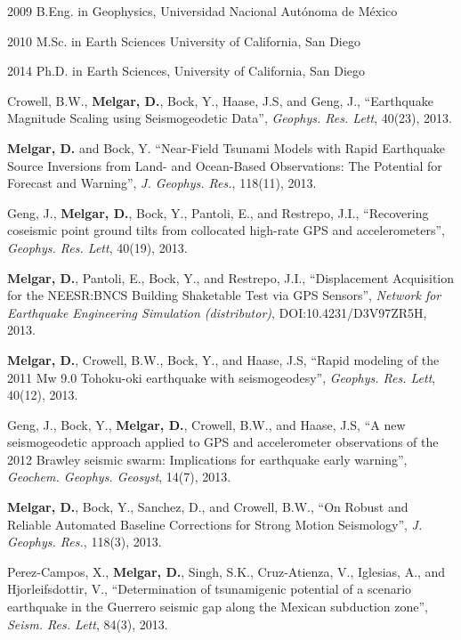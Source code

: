 \begin{frontmatter}
%
%
\begin{vitapage}
\begin{vita}
  \item[2009] B.Eng. in Geophysics, Universidad Nacional Aut\'onoma de M\'exico
  \item[2010] M.Sc. in Earth Sciences University of California, San Diego
  \item[2014] Ph.D. in Earth Sciences, University of California, San Diego 
\end{vita}
\begin{publications}
\item Crowell, B.W., \textbf{Melgar, D.}, Bock, Y., Haase, J.S, and Geng, J., ``Earthquake Magnitude Scaling using Seismogeodetic Data'', \emph{Geophys. Res. Lett}, 40(23), 2013.
\item \textbf{Melgar, D.} and Bock, Y. ``Near-Field Tsunami Models with Rapid Earthquake Source Inversions from Land- and Ocean-Based Observations: The Potential for Forecast and Warning'', \emph{J. Geophys. Res.}, 118(11), 2013.
\item Geng, J., \textbf{Melgar, D.}, Bock, Y., Pantoli, E., and Restrepo, J.I., ``Recovering coseismic point ground tilts from collocated high-rate GPS and accelerometers'', \emph{Geophys. Res. Lett}, 40(19), 2013.
\item \textbf{Melgar, D.}, Pantoli, E., Bock, Y., and Restrepo, J.I., ``Displacement Acquisition for the NEESR:BNCS Building Shaketable Test via GPS Sensors'', \emph{Network for Earthquake Engineering Simulation (distributor)}, DOI:10.4231/D3V97ZR5H, 2013.
\item \textbf{Melgar, D.}, Crowell, B.W., Bock, Y., and Haase, J.S, ``Rapid modeling of the 2011 Mw 9.0 Tohoku-oki earthquake with seismogeodesy'', \emph{Geophys. Res. Lett}, 40(12), 2013.
\item Geng, J., Bock, Y., \textbf{Melgar, D.}, Crowell, B.W., and Haase, J.S, ``A new seismogeodetic approach applied to GPS and accelerometer observations of the 2012 Brawley seismic swarm: Implications for earthquake early warning'', \emph{Geochem. Geophys. Geosyst}, 14(7), 2013.
\item \textbf{Melgar, D.}, Bock, Y., Sanchez, D., and Crowell, B.W., ``On Robust and Reliable Automated Baseline Corrections for Strong Motion Seismology'', \emph{J. Geophys. Res.}, 118(3), 2013.
\item Perez-Campos, X., \textbf{Melgar, D.}, Singh, S.K., Cruz-Atienza, V., Iglesias, A., and Hjorleifsdottir, V., ``Determination of tsunamigenic potential of a scenario earthquake in the Guerrero seismic gap along the Mexican subduction zone'', \emph{Seism. Res. Lett}, 84(3), 2013.

\end{publications}
\end{vitapage}
\end{frontmatter}
